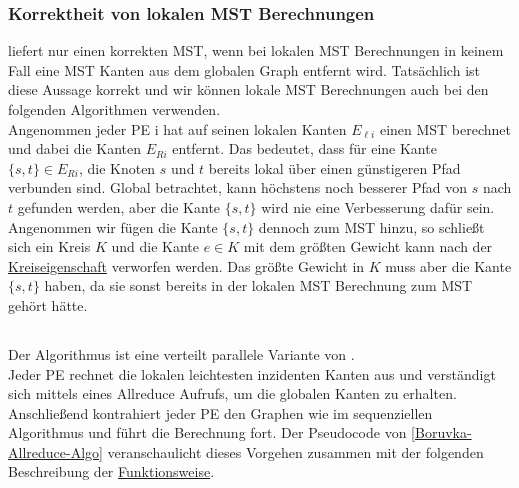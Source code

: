 \subsubsection{Korrektheit von lokalen MST Berechnungen}\label{Korrektheit}
\mergeMST liefert nur einen korrekten MST, wenn bei lokalen MST Berechnungen in keinem Fall eine MST Kanten aus dem globalen Graph entfernt wird.
Tatsächlich ist diese Aussage korrekt und wir können lokale MST Berechnungen auch bei den folgenden Algorithmen verwenden. \\
Angenommen jeder PE i hat auf seinen lokalen Kanten $E_{\ell i}$ einen MST berechnet und dabei die Kanten $E_{Ri}$ entfernt. Das bedeutet, dass für eine Kante $\{s,t\} \in E_{Ri}$, die Knoten $s$ und $t$ bereits lokal über einen günstigeren Pfad verbunden sind. Global betrachtet, kann höchstens noch besserer Pfad von $s$ nach $t$ gefunden werden, aber die Kante $\{s,t\}$ wird nie eine Verbesserung dafür sein. Angenommen wir fügen die Kante $\{s,t\}$ dennoch zum MST hinzu, so schließt sich ein Kreis $K$ und die Kante $e \in K$  mit dem größten Gewicht kann nach der \hyperref[Kreiseigenschaft]{Kreiseigenschaft} verworfen werden. Das größte Gewicht in $K$ muss aber die Kante $\{s,t\}$ haben, da sie sonst bereits in der lokalen MST Berechnung zum MST gehört hätte.

\subsection{\boruvkaAllreduce}
Der \boruvkaAllreduce Algorithmus ist eine verteilt parallele Variante von \boruvkasAlgorithmus \space\cite{boruuvka1926jistem}. \\
Jeder PE rechnet die lokalen leichtesten inzidenten Kanten aus und verständigt sich mittels eines Allreduce Aufrufs, um die globalen Kanten zu erhalten. Anschließend kontrahiert jeder PE den Graphen wie im sequenziellen \boruvka Algorithmus und führt die Berechnung fort. Der Pseudocode von \cref{Boruvka-Allreduce-Algo} veranschaulicht dieses Vorgehen zusammen mit der folgenden Beschreibung der  \hyperref[Funktion-Borruvka]{Funktionsweise}.

